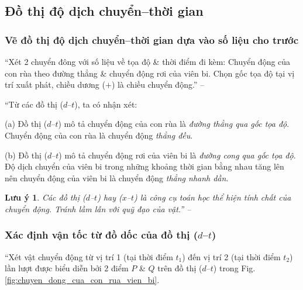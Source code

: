 \documentclass[oneside]{book}
\numberwithin{equation}{section}
\newtheorem{luuy}{Lưu ý}[section]
\begin{document}
\subsection{Đồ thị độ dịch chuyển--thời gian}

\subsubsection{Vẽ đồ thị độ dịch chuyển--thời gian dựa vào số liệu cho trước}
``Xét 2 chuyển đông với số liệu về tọa độ \& thời điểm đi kèm: Chuyển động của con rùa theo đường thẳng \& chuyển động rơi của viên bi. Chọn gốc tọa độ tại vị trí xuất phát, chiều dương ($+$) là chiều chuyển động.'' -- \cite[p. 28]{SGK_Vat_Ly_10_Chan_Troi_Sang_Tao}

``Từ các đồ thị ($d$--$t$), ta có nhận xét:
\begin{enumerate*}
	\item[(a)] Đồ thị ($d$--$t$) mô tả chuyển động của con rùa là \textit{đường thẳng qua gốc tọa độ}. Chuyển động của con rùa là chuyển động \textit{thẳng đều}.
	\item[(b)] Đồ thị ($d$--$t$) mô tả chuyển động rơi của viên bi là \textit{đường cong qua gốc tọa độ}. Độ dịch chuyển của viên bi trong những khoảng thời gian bằng nhau tăng lên nên chuyển động của viên bi là chuyển động \textit{thẳng nhanh dần}.
\end{enumerate*}

\begin{luuy}
	Các đồ thị ($d$--$t$) hay ($x$--$t$) là công cụ toán học thể hiện tính chất của chuyển động. Tránh lầm lẫn với quỹ đạo của vật.'' -- \cite[p. 29]{SGK_Vat_Ly_10_Chan_Troi_Sang_Tao}
\end{luuy}

\subsubsection{Xác định vận tốc từ đồ dốc của đồ thị ($d$--$t$)}
``Xét vật chuyển động từ vị trí 1 (tại thời điểm $t_1$) đến vị trí 2 (tại thời điểm $t_2$) lần lượt được biểu diễn bởi 2 điểm $P$ \& $Q$ trên đồ thị ($d$--$t$) trong Fig. \ref{fig:chuyen_dong_cua_con_rua_vien_bi}.
\end{document}
